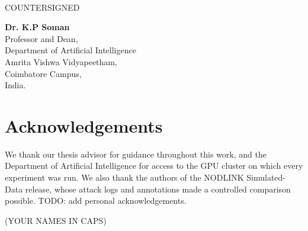 \documentclass[a4paper, 12pt]{report}
\theoremstyle{definition}
\begin{document}
	\vspace*{1cm}
	 \\
	\vfill
	\begin{center}
		\large{COUNTERSIGNED}\\
	\end{center}
	\vspace{0.6in}

\begin{center}
		\textbf{Dr. K.P Soman}\\
	Professor and Dean, \\
	Department of Artificial Intelligence \\ Amrita Vishwa Vidyapeetham,\\
	Coimbatore Campus,\\
	India.
\end{center}

	\clearpage
	\tableofcontents

	\chapter*{Acknowledgements}
	We thank our thesis advisor for guidance throughout this work, and the Department of Artificial Intelligence for access to the GPU cluster on which every experiment was run. We also thank the authors of the NODLINK Simulated-Data release, whose attack logs and annotations made a controlled comparison possible. TODO: add personal acknowledgements.\\
	\vspace{1cm}
	\begin{flushright}
		(YOUR NAMES IN CAPS)
	\end{flushright}
	\listoffigures
	\listoftables
	\newpage
\end{document}
